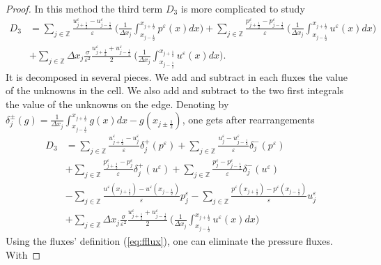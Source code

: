 \documentclass[a4paper,french,english,10pt]{article}
\newcommand\eps{\varepsilon}
\begin{document}
\begin{proof}
In this method the third term
 $D_3$ is more complicated to study
\begin{equation*}
\begin{aligned}
 D_3 &= \sum_{j\in \mathbb{Z}}
\frac{u_{j+\frac12 }^{\eps}-u_{j-\frac12 }^{\eps}}{\eps} \: \bigg(
\frac{1}{\Delta x_j} {\int_{x_{j-\frac12}}^{x_{j+\frac12}}}
 p^{\eps}(x) dx \bigg)
+\sum_{j\in \mathbb{Z}}
\frac{p_{j+\frac12 }^{\eps}-p_{j-\frac12 }^{\eps}}{\eps} \: \bigg(
\frac{1}{\Delta x_j} 
{\int_{x_{j-\frac12}}^{x_{j+\frac12}}}
 u^{\eps}(x) dx \bigg) \\
&+\sum_{j\in \mathbb{Z}} \Delta x_j  \frac{\sigma}{\eps^2}
\frac{u_{j+\frac12 }^{\eps}+u_{j-\frac12 }^{\eps}}{2}\: \bigg(
\frac{1}{\Delta x_j} {\int_{x_{j-\frac12}}^{x_{j+\frac12}}}
 u^{\eps}(x) dx \bigg).
\end{aligned}
\end{equation*}
 It is  decomposed in several pieces.
We add and subtract in each fluxes  the value of the unknowns in the
cell. We also add and subtract to the two first  integrals the value of the
unknowns on the edge. Denoting by $\delta_{j }^\pm
\left( g \right) =\frac{1}{\Delta
x_j} {\int_{x_{j-\frac12}}^{x_{j+\frac12}}} g(x) dx -g(x_{j\pm\frac12 })$,
 one gets after rearrangements
\begin{equation*}
\begin{aligned}
 D_3 &= \underset{j\in \mathbb{Z}}{\sum}
\frac{u_{j+\frac12 }^{\eps}-u_j^{\eps}}{\eps} \delta_{j}^+\left(p^{\eps}\right)+
\underset{j\in \mathbb{Z}}{\sum}
\frac{u^{\eps}_j-u_{j-\frac12 }^{\eps}}{\eps}\delta_{j}^-\left(p^{\eps}\right)
\\
& + \underset{j\in \mathbb{Z}}{\sum}
\frac{p_{j+\frac12 }^{\eps}-p_{j}^{\eps}}{\eps} 
\delta_{j}^+\left(u^{\eps}\right)
+\underset{j\in \mathbb{Z}}{\sum}
\frac{p^{\eps}_j-p_{j-\frac12 }^{\eps}}{\eps} 
\delta_{j}^-\left(u^{\eps}\right) \\
&-\underset{j\in \mathbb{Z}}{\sum} 
\frac{u^{\eps}(x_{j+\frac12 })-u^{\eps}(x_{j-\frac12 })}{\eps} 
p^{\eps}_j -
\underset{j\in \mathbb{Z}}{\sum} 
\frac{p^{\eps}(x_{j+\frac12 })-p^{\eps}(x_{j-\frac12 })}{\eps}
u^{\eps}_j  \\
&+ \underset{j\in \mathbb{Z}}{\sum} \Delta x_j  \frac{\sigma}{\eps^2}
\frac{u_{j+\frac12 }^{\eps}+u_{j-\frac12 }^{\eps}}{2}\: \bigg(
\frac{1}{\Delta x_j} {\int_{x_{j-\frac12}}^{x_{j+\frac12}}}u^{\eps}(x) dx \bigg)
\end{aligned}
\end{equation*}
Using the fluxes' definition (\ref{eq:fflux}), one can 
eliminate the pressure fluxes. With

\end{proof}
\end{document}
